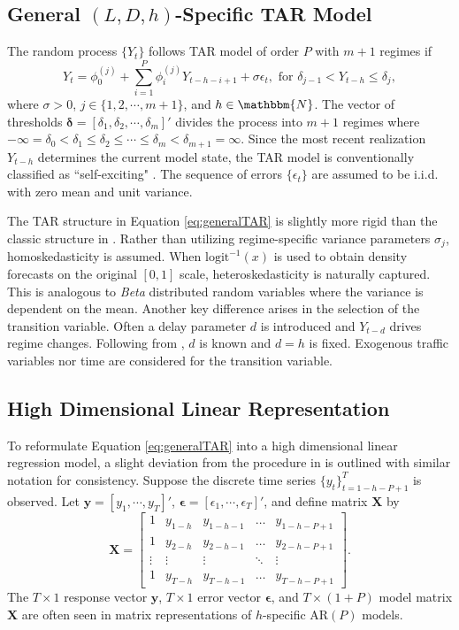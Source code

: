 \subsection{General $(L,D,h)$-Specific TAR Model}
The random process $\{Y_t\}$ follows TAR model of order $P$ with $m+1$ regimes if 
\begin{equation}
\label{eq:generalTAR}
Y_{t}=\phi_0^{(j)}+\sum\limits_{i=1}^P \phi^{(j)}_i Y_{t-h-i+1}+\sigma\epsilon_{t}, \textrm{ for } \delta_{j-1}<Y_{t-h}\leq \delta_{j},
\end{equation}
where $\sigma>0$, $j\in\{1,2,\cdots,m+1\}$, and $h \in \mathbbm{N}$. The vector of thresholds $\bm{\delta}=[\delta_1,\delta_2,\cdots,\delta_m]'$ divides the process into $m+1$ regimes where $-\infty=\delta_0<\delta_1\leq\delta_2\leq \cdots \leq \delta_m<\delta_{m+1}=\infty$. Since the most recent realization $Y_{t-h}$ determines the current model state, the TAR model is conventionally classified as ``self-exciting" \citep{Ghaddar1981}. The sequence of errors $\{\epsilon_t\}$ are assumed to be i.i.d. with zero mean and unit variance.

The TAR structure in Equation \ref{eq:generalTAR} is slightly more rigid than the classic structure in \cite{Chen1995}. Rather than utilizing regime-specific variance parameters $\sigma_j$,  homoskedasticity is assumed. When $\textrm{logit}^{-1}(x)$ is used to obtain density forecasts on the original $[0,1]$ scale, heteroskedasticity is naturally captured. This is analogous to \textit{Beta} distributed random variables where the variance is dependent on the mean. Another key difference arises in the selection of the transition variable. Often a delay parameter $d$ is introduced and $Y_{t-d}$ drives regime changes. Following from \cite{Chan2015}, $d$ is known and  $d=h$ is fixed. Exogenous traffic variables nor time are considered for the transition variable.

\subsection{High Dimensional Linear Representation}
To reformulate Equation \ref{eq:generalTAR} into a high dimensional linear regression model, a slight deviation from the procedure in \cite{Chan2015,Chan2017} is outlined with similar notation for consistency. Suppose the discrete time series $\{y_t\}_{t=1-h-P+1}^T$ is observed. Let $\bm{y}=[y_{1},\cdots,y_{T}]'$, $\bm{\epsilon}=[\epsilon_{1},\cdots,\epsilon_{T}]'$, and define matrix $\bm{X}$ by
$$
\bm{X}=\begin{bmatrix}
    1 & y_{1-h} & y_{1-h-1} & \dots  & y_{1-h-P+1} \\
    1 & y_{2-h} & y_{2-h-1} & \dots  & y_{2-h-P+1} \\
    \vdots & \vdots & \vdots & \ddots & \vdots \\
    1 & y_{T-h} & y_{T-h-1} & \dots  & y_{T-h-P+1}
\end{bmatrix}.
$$
The $T\times 1$ response vector $\bm{y}$, $T\times 1$ error vector $\bm{\epsilon}$, and  $T \times (1+P)$ model matrix $\bm{X}$ are often seen in matrix representations of $h$-specific AR$(P)$ models.

